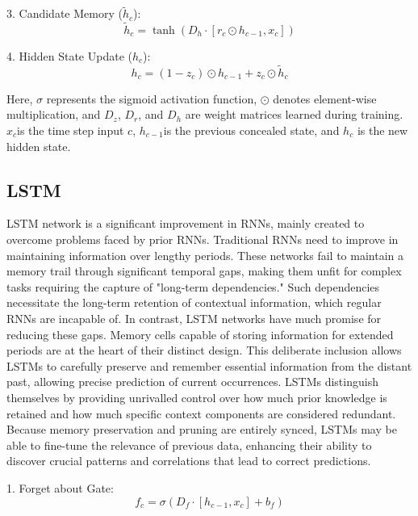 \documentclass[a4paper,fleqn]{cas-sc}
\begin{document}
3. Candidate Memory ($\tilde{h}_c$):
\begin{equation}
\tilde{h}_c = \tanh(D_h \cdot [r_c \odot h_{c-1}, x_c])
\end{equation}

4. Hidden State Update ($h_c$):
\begin{equation}
h_c = (1 - z_c) \odot h_{c-1} + z_c \odot \tilde{h}_c
\end{equation}

Here, $\sigma$ represents the sigmoid activation function, $\odot$ denotes element-wise multiplication, and $D_z$, $D_r$, and $D_h$ are weight matrices learned during training. $x_c$is the time step input $c$, $h_{c-1}$is the previous concealed state, and $h_c$ is the new hidden state.





\subsection{LSTM}
LSTM network is a significant improvement in RNNs, mainly created to overcome problems faced by prior RNNs. Traditional RNNs need to improve in maintaining information over lengthy periods. These networks fail to maintain a memory trail through significant temporal gaps, making them unfit for complex tasks requiring the capture of "long-term dependencies." Such dependencies necessitate the long-term retention of contextual information, which regular RNNs are incapable of. In contrast, LSTM networks have much promise for reducing these gaps. Memory cells capable of storing information for extended periods are at the heart of their distinct design\cite{abdel2020reliable}. This deliberate inclusion allows LSTMs to carefully preserve and remember essential information from the distant past, allowing precise prediction of current occurrences. LSTMs distinguish themselves by providing unrivalled control over how much prior knowledge is retained and how much specific context components are considered redundant. Because memory preservation and pruning are entirely synced, LSTMs may be able to fine-tune the relevance of previous data, enhancing their ability to discover crucial patterns and correlations that lead to correct predictions\cite{shireen2018iterative}.



1. Forget about Gate:
\begin{equation}
f_c = \sigma(D_f \cdot [h_{c-1}, x_c] + b_f)
\end{equation}
\end{document}
